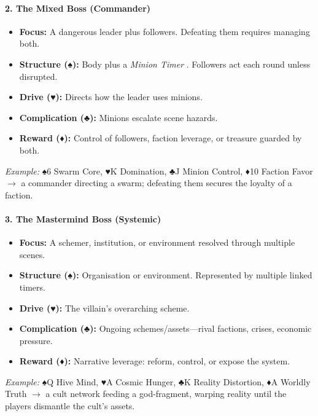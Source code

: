 \paragraph{2. The Mixed Boss (Commander)}
\begin{itemize}
    \item \textbf{Focus:} A dangerous leader plus followers. Defeating them requires managing both.
    \item \textbf{Structure (♠):} Body plus a \emph{Minion Timer }. Followers act each round unless disrupted.
    \item \textbf{Drive (♥):} Directs how the leader uses minions.
    \item \textbf{Complication (♣):} Minions escalate scene hazards.
    \item \textbf{Reward (♦):} Control of followers, faction leverage, or treasure guarded by both.
\end{itemize}
\emph{Example:} ♠6 Swarm Core, ♥K Domination, ♣J Minion Control, ♦10 Faction Favor $\rightarrow$ a commander directing a swarm; defeating them secures the loyalty of a faction.

\paragraph{3. The Mastermind Boss (Systemic)}
\begin{itemize}
    \item \textbf{Focus:} A schemer, institution, or environment resolved through multiple scenes.
    \item \textbf{Structure (♠):} Organisation or environment. Represented by multiple linked timers.
    \item \textbf{Drive (♥):} The villain's overarching scheme.
    \item \textbf{Complication (♣):} Ongoing schemes/assets---rival factions, crises, economic pressure.
    \item \textbf{Reward (♦):} Narrative leverage: reform, control, or expose the system.
\end{itemize}
\emph{Example:} ♠Q Hive Mind, ♥A Cosmic Hunger, ♣K Reality Distortion, ♦A Worldly Truth $\rightarrow$ a cult network feeding a god-fragment, warping reality until the players dismantle the cult's assets.

